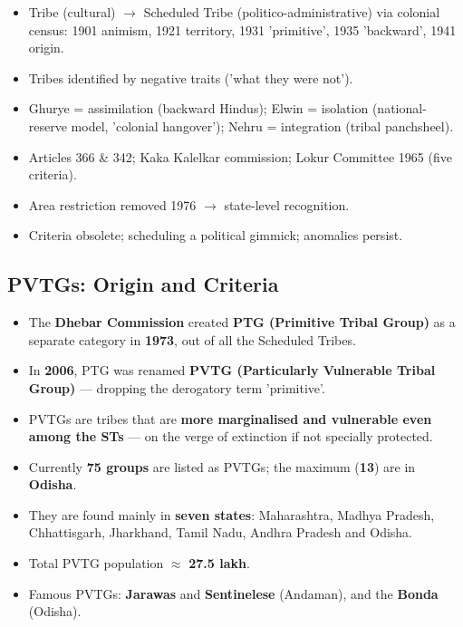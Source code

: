 \begin{QuickRevision}
\begin{itemize}
\item Tribe (cultural) $\rightarrow$ Scheduled Tribe (politico-administrative) via colonial census: 1901 animism, 1921 territory, 1931 'primitive', 1935 'backward', 1941 origin.
\item Tribes identified by negative traits ('what they were not').
\item Ghurye = assimilation (backward Hindus); Elwin = isolation (national-reserve model, 'colonial hangover'); Nehru = integration (tribal panchsheel).
\item Articles 366 \& 342; Kaka Kalelkar commission; Lokur Committee 1965 (five criteria).
\item Area restriction removed 1976 $\rightarrow$ state-level recognition.
\item Criteria obsolete; scheduling a political gimmick; anomalies persist.
\end{itemize}
\end{QuickRevision}

\subsection{PVTGs: Origin and Criteria}

\begin{GovtPolicy}
\begin{itemize}
\item The \textbf{Dhebar Commission} created \textbf{PTG (Primitive Tribal Group)} as a separate category in \textbf{1973}, out of all the Scheduled Tribes.
\item In \textbf{2006}, PTG was renamed \textbf{PVTG (Particularly Vulnerable Tribal Group)} --- dropping the derogatory term 'primitive'.
\item PVTGs are tribes that are \textbf{more marginalised and vulnerable even among the STs} --- on the verge of extinction if not specially protected.
\end{itemize}
\end{GovtPolicy}

\begin{DataFact}
\begin{itemize}
\item Currently \textbf{75 groups} are listed as PVTGs; the maximum (\textbf{13}) are in \textbf{Odisha}.
\item They are found mainly in \textbf{seven states}: Maharashtra, Madhya Pradesh, Chhattisgarh, Jharkhand, Tamil Nadu, Andhra Pradesh and Odisha.
\item Total PVTG population $\approx$ \textbf{27.5 lakh}.
\item Famous PVTGs: \textbf{Jarawas} and \textbf{Sentinelese} (Andaman), and the \textbf{Bonda} (Odisha).
\end{itemize}
\end{DataFact}

